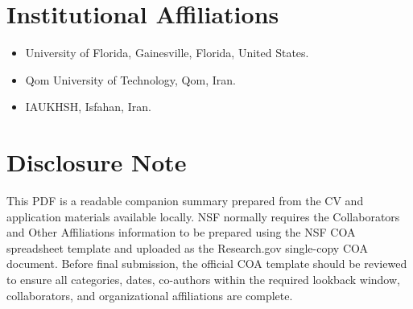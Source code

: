 \documentclass[11pt,letterpaper]{article}
\begin{document}
\section*{Institutional Affiliations}
\begin{itemize}
\item University of Florida, Gainesville, Florida, United States.
\item Qom University of Technology, Qom, Iran.
\item IAUKHSH, Isfahan, Iran.
\end{itemize}

\section*{Disclosure Note}
This PDF is a readable companion summary prepared from the CV and application materials available locally. NSF normally requires the Collaborators and Other Affiliations information to be prepared using the NSF COA spreadsheet template and uploaded as the Research.gov single-copy COA document. Before final submission, the official COA template should be reviewed to ensure all categories, dates, co-authors within the required lookback window, collaborators, and organizational affiliations are complete.
\end{document}
